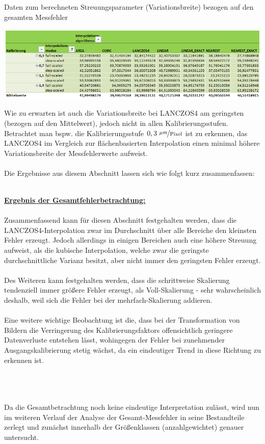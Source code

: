 \documentclass[
fontsize=10pt, 
listof = totoc,
parskip = half	
]{report}
\begin{document}
\begin{table}[H]
	\centering
	\caption{Daten zum berechneten Streuungsparameter (Variationsbreite) bezogen auf den gesamten Messfehler}
	\label{tab:DAGesamtStreu2Alle}
	\includegraphics[width=\textwidth, height=\textheight, keepaspectratio]{pics/Tab_DA_Gesamt_Streu2_Alle}
\end{table}


\noindent Wie zu erwarten ist auch die Variationsbreite bei LANCZOS4 am geringsten (bezogen auf den Mittelwert), jedoch nicht in allen Kalibrierungsstufen. Betrachtet man bspw. die Kalibrierungsstufe $0,3~\nicefrac{\mu m}{\text{Pixel}}$ ist zu erkennen, das LANCZOS4 im Vergleich zur flächenbasierten Interpolation einen minimal höhere Variationsbreite der Messfehlerwerte aufweist. 
\\\\
Die Ergebnisse aus diesem Abschnitt lassen sich wie folgt kurz zusammenfassen:
\\\\
\colorbox{gray!10}{
	\label{box:ErgebnisGesamtauswertung}
	\begin{minipage}{0.975\textwidth}
		\textbf{\underline{Ergebnis der Gesamtfehlerbetrachtung:}}\\\\
		Zusammenfassend kann für diesen Abschnitt festgehalten werden, dass die LANCZOS4-Interpolation zwar im Durchschnitt über alle Bereiche den kleinsten Fehler erzeugt. Jedoch allerdings in einigen Bereichen auch eine höhere Streuung aufweist, als die kubische Interpolation, welche zwar die geringste durchschnittliche Varianz besitzt, aber nicht immer den geringsten Fehler erzeugt.
		\\\\
		\noindent Des Weiteren kann festgehalten werden, dass die schrittweise Skalierung tendenziell immer größere Fehler erzeugt, als Voll-Skalierung - sehr wahrscheinlich deshalb, weil sich die Fehler bei der mehrfach-Skalierung addieren. 
		\\\\
		\noindent Eine weitere wichtige Beobachtung ist die, dass bei der Transformation von Bildern die Verringerung des Kalibrierungsfaktors offensichtlich geringere Datenverluste entstehen lässt, wohingegen der Fehler bei zunehmender Ausgangskalibrierung stetig wächst, da ein eindeutiger Trend in diese Richtung zu erkennen ist.
	\end{minipage}
}
\\\\\\
Da die Gesamtbetrachtung noch keine eindeutige Interpretation zulässt, wird nun im weiteren Verlauf der Analyse der Gesamt-Messfehler in seine Bestandteile zerlegt und zunächst innerhalb der Größenklassen (anzahlgewichtet) genauer untersucht.
\end{document}
